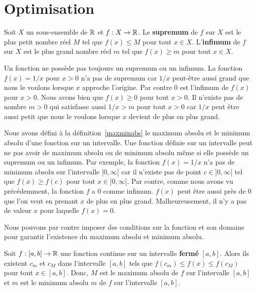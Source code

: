 {\section{Optimisation}\label{Optim1D}

\begin{defn}
Soit $X$ un sous-ensemble de $\mathbb{R}$ et $f:X \rightarrow \mathbb{R}$.  Le
{\bfseries supremum} de $f$ sur $X$ est le plus petit
nombre réel $M$ tel que $f(x) \leq M$ pour tout $x \in X$. 
L'{\bfseries infimum} de $f$ sur $X$ est le plus grand
nombre réel $m$ tel que $f(x) \geq m$ pour tout $x \in X$.
\end{defn}

Un fonction ne possède pas toujours un supremum ou un infimum.
La fonction $f(x) = 1/x$ pour $x>0$ n'a pas de supremum car $1/x$
peut-être aussi grand que nous le voulons lorsque $x$ approche l'origine.
Par contre $0$ est l'infimum de $f(x)$ pour $x>0$.  Nous avons bien que
$f(x) \geq 0$ pour tout $x>0$.  Il n'existe pas de nombre $m>0$ qui
satisfasse aussi $1/x > m$ pour tout $x>0$ car $1/x$ peut être aussi
petit que nous le voulons lorsque $x$ devient de plus en plus grand.

Nous avons défini à la définition~\ref{maxminabs} le maximum absolu et
le minimum absolu d'une fonction sur un intervalle.  Une fonction
définie sur un intervalle peut ne pas avoir de maximum absolu ou de
minimum absolu même si elle possède un supremum ou un infimum.
Par exemple, la fonction $f(x) = 1/x$ n'a pas de minimum absolu sur
l'intervalle $]0,\infty[$ car il n'existe pas de point
$c \in ]0,\infty[$ tel que $f(x) \geq f(c)$ pour tout $x \in ]0,\infty[$.   
Par contre, comme nous avons vu précédemment, la fonction $f$ a $0$
comme infimum.  $f(x)$ peut être aussi près de $0$ que l'on veut en
prenant $x$ de plus en plus grand.  Malheureusement, il n'y a pas de
valeur $x$ pour laquelle $f(x) = 0$.

Nous pouvons par contre imposer des conditions sur la fonction et son
domaine pour garantir l'existence du maximum absolu et minimum
absolu.

\begin{theorem}
Soit $f:[a,b]\to \mathbb{R}$ une fonction continue sur un intervalle
{\bfseries fermé} $[a,b]$.  Alors ils existent $c_m$ et $c_M$ dans
l'intervalle $[a,b]$ tels que $f(c_m) \leq f(x) \leq f(c_M)$ pour tout
$x \in [a,b]$.  Donc, $M$ est le maximum absolu de $f$ sur
l'intervalle $[a,b]$ et $m$ est le minimum absolu $m$ de $f$ sur
l'intervalle $[a,b]$.
\end{theorem}

}
